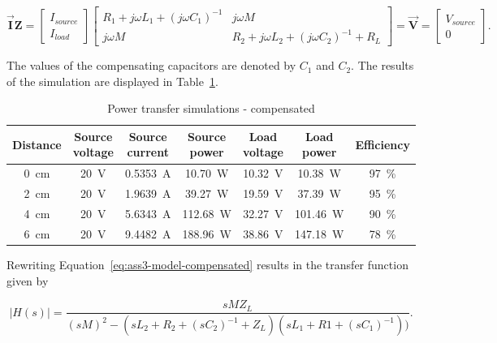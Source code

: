 \documentclass[11pt,titlepage]{report}
\begin{document}
\begin{equation} \label{eq:ass3-model-compensated}
	\mathbf{\vec{I}} \mathbf{Z}=
	\begin{bmatrix}
		I_{source} \\
		I_{load}
	\end{bmatrix}
	\begin{bmatrix}
		R_1 + j \omega L_1 + (j \omega C_1)^{-1}  & j \omega M\\
		j \omega M & R_2 + j \omega L_2 + (j \omega C_2)^{-1}  + R_L
	\end{bmatrix}
	= \mathbf{\vec{V}} =
	\begin{bmatrix}
		V_{source} \\
		0
	\end{bmatrix} .
\end{equation}

The values of the compensating capacitors are denoted by $C_1$ and $C_2$. The results of the simulation are displayed in Table~\ref{tab:ass3-power-sim}. 

\begin{table}[H]
	\centering
	\caption{Power transfer simulations - compensated}
	\label{tab:ass3-power-sim}
	\begin{tabular}{c c c c c c c}
		\hline\hline
		Distance & Source voltage & Source current & Source power & Load voltage & Load power & Efficiency \\
		\hline
		\SI{0}{cm} & \SI{20}{V} & \SI{0.5353}{A} & \SI{10.70}{W} & \SI{10.32}{V} & \SI{10.38}{W} & \SI{97}{\percent} \\
		\SI{2}{cm} & \SI{20}{V} & \SI{1.9639}{A} & \SI{39.27}{W} & \SI{19.59}{V} & \SI{37.39}{W} & \SI{95}{\percent} \\
		\SI{4}{cm} & \SI{20}{V} & \SI{5.6343}{A} & \SI{112.68}{W} & \SI{32.27}{V} & \SI{101.46}{W} & \SI{90}{\percent} \\
		\SI{6}{cm} & \SI{20}{V} & \SI{9.4482}{A} & \SI{188.96}{W} & \SI{38.86}{V} & \SI{147.18}{W} & \SI{78}{\percent} \\
		\hline
		\end{tabular}
\end{table}

Rewriting Equation~\ref{eq:ass3-model-compensated} results in the transfer function given by

\begin{equation} \label{eq:ass3-transfer-function}
	|H(s)| = \frac{s M Z_L}{(s M)^2 - (s L_2 + R_2 + (s C_2)^{-1} + Z_L) ( s L_1 + R1 + (s C_1)^{-1}))} .
\end{equation}
\end{document}

